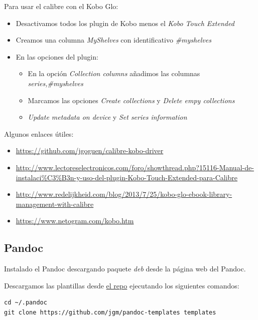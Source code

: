 \documentclass[12pt,spanish,]{scrartcl}
\providecommand{\tightlist}{%
  \setlength{\itemsep}{0pt}\setlength{\parskip}{0pt}}
\begin{document}
Para usar el calibre con el Kobo Glo:

\begin{itemize}
\item
  Desactivamos todos los plugin de Kobo menos el \emph{Kobo Touch
  Extended}
\item
  Creamos una columna \emph{MyShelves} con identificativo
  \emph{\#myshelves}
\item
  En las opciones del plugin:

  \begin{itemize}
  \tightlist
  \item
    En la opción \emph{Collection columns} añadimos las columnas
    \emph{series,\#myshelves}
  \item
    Marcamos las opciones \emph{Create collections} y \emph{Delete empy
    collections}
  \item
    \emph{Update metadata on device} y \emph{Set series information}
  \end{itemize}
\end{itemize}

Algunos enlaces útiles:

\begin{itemize}
\tightlist
\item
  \url{https://github.com/jgoguen/calibre-kobo-driver}
\item
  \url{http://www.lectoreselectronicos.com/foro/showthread.php?15116-Manual-de-instalaci\%C3\%B3n-y-uso-del-plugin-Kobo-Touch-Extended-para-Calibre}
\item
  \url{http://www.redelijkheid.com/blog/2013/7/25/kobo-glo-ebook-library-management-with-calibre}
\item
  \url{https://www.netogram.com/kobo.htm}
\end{itemize}

\subsection{Pandoc}\label{pandoc}

Instalado el Pandoc descargando paquete \emph{deb} desde la página web
del Pandoc.

Descargamos las plantillas desde
\href{https://github.com/jgm/pandoc-templates}{el repo} ejecutando los
siguientes comandos:

\begin{verbatim}
cd ~/.pandoc
git clone https://github.com/jgm/pandoc-templates templates
\end{verbatim}
\end{document}

